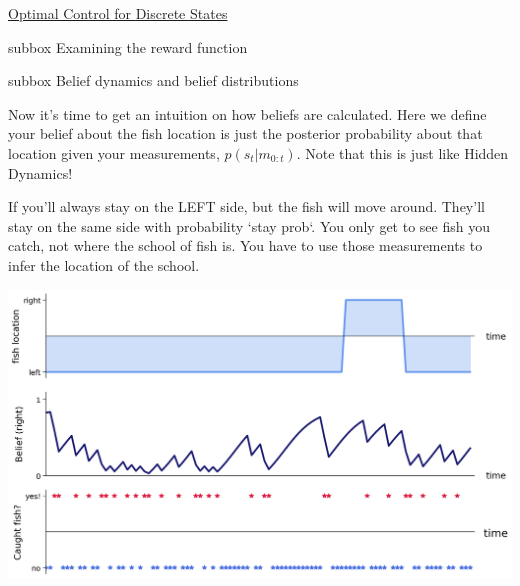 \begin{textbox}{\href{https://compneuro.neuromatch.io/tutorials/W3D3_OptimalControl/student/W3D3_Tutorial1.html}{Optimal Control for Discrete States }   }
\begin{subbox}{subbox}{ Examining the reward function}
\end{subbox}
\begin{subbox}{subbox}{ Belief dynamics and belief distributions}
\scriptsize

Now it's time to get an intuition on how beliefs are calculated. Here we define your belief about the fish location is just the posterior probability about that location given your measurements, $p(s_t|m_{0:t})$. Note that this is just like Hidden Dynamics!

If you'll always stay on the LEFT side, but the fish will move around. They'll stay on the same side with probability `stay prob`. You only get to see fish you catch, not where the school of fish is. You have to use those measurements to infer the location of the school.

\begin{center}
    
\includegraphics[scale=0.21]{Figures/OC/OC_Figure3.png}
\end{center}

\end{subbox}
\end{textbox}
